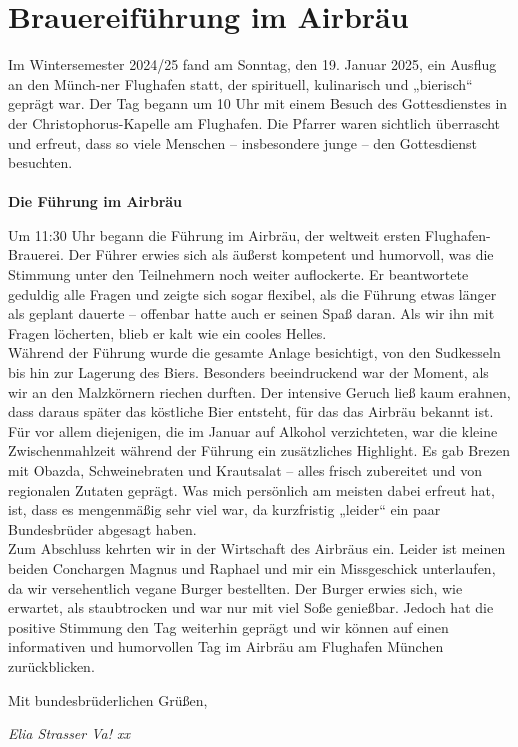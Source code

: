 \section{Brauereiführung im Airbräu}


\begin{multicols}{2}
Im Wintersemester 2024/25 fand am Sonntag, den 19. Januar 2025, ein Ausflug
an den Münch-ner Flughafen statt, der spirituell, kulinarisch und „bierisch“
geprägt war. Der Tag begann um 10 Uhr mit einem Besuch des Gottesdienstes in
der Christophorus-Kapelle am Flughafen. Die Pfarrer waren sichtlich überrascht
und erfreut, dass so viele Menschen – insbesondere junge – den Gottesdienst
besuchten.
\\
\\
\textbf{Die Führung im Airbräu}

Um 11:30 Uhr begann die Führung im Airbräu, der weltweit ersten
Flughafen-Brauerei. Der Führer erwies sich als äußerst kompetent und humorvoll,
was die Stimmung unter den Teilnehmern noch weiter auflockerte. Er beantwortete
geduldig alle Fragen und zeigte sich sogar flexibel, als die Führung etwas
länger als geplant dauerte – offenbar hatte auch er seinen Spaß daran. Als wir
ihn mit Fragen löcherten, blieb er kalt wie ein cooles Helles.\\
Während der Führung wurde die gesamte Anlage besichtigt, von den Sudkesseln
bis hin zur Lagerung des Biers. Besonders beeindruckend war der Moment, als wir
an den Malzkörnern riechen durften. Der intensive Geruch ließ kaum erahnen,
dass daraus später das köstliche Bier entsteht, für das das Airbräu bekannt
ist.\\
Für vor allem diejenigen, die im Januar auf Alkohol verzichteten, war die
kleine Zwischenmahlzeit während der Führung ein zusätzliches Highlight. Es gab
Brezen mit Obazda, Schweinebraten und Krautsalat – alles frisch zubereitet und
von regionalen Zutaten geprägt. Was mich persönlich am meisten dabei erfreut
hat, ist, dass es mengenmäßig sehr viel war, da kurzfristig „leider“ ein paar
Bundesbrüder abgesagt haben.\\
Zum Abschluss kehrten wir in der Wirtschaft des Airbräus ein. Leider ist
meinen beiden Conchargen Magnus und Raphael und mir ein Missgeschick
unterlaufen, da wir versehentlich vegane Burger bestellten. Der Burger erwies
sich, wie erwartet, als staubtrocken und war nur mit viel Soße genießbar.
Jedoch hat die positive Stimmung den Tag weiterhin geprägt und wir können auf
einen informativen und humorvollen Tag im Airbräu am Flughafen München
zurückblicken.

Mit bundesbrüderlichen Grüßen,

\begin{flushright}
		\hfill\emph{Elia Strasser Va! xx}
	\end{flushright}
		
\end{multicols}



